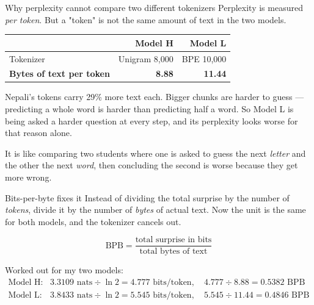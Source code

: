 \documentclass[11pt]{report}
\begin{document}
\begin{concept}{Why perplexity cannot compare two different tokenizers}
Perplexity is measured \emph{per token}. But a "token" is not the same amount of
text in the two models.

\begin{center}
\begin{tabular}{lrr}
\toprule
& Model H & Model L \\
\midrule
Tokenizer & Unigram 8,000 & BPE 10,000 \\
\textbf{Bytes of text per token} & \textbf{8.88} & \textbf{11.44} \\
\bottomrule
\end{tabular}
\end{center}

Nepali's tokens carry 29\% more text each. Bigger chunks are harder to guess ---
predicting a whole word is harder than predicting half a word. So Model L is
being asked a harder question at every step, and its perplexity looks worse for
that reason alone.

It is like comparing two students where one is asked to guess the next
\emph{letter} and the other the next \emph{word}, then concluding the second is
worse because they get more wrong.
\end{concept}

\begin{concept}{Bits-per-byte fixes it}
Instead of dividing the total surprise by the number of \emph{tokens}, divide it
by the number of \emph{bytes} of actual text. Now the unit is the same for both
models, and the tokenizer cancels out.

\[
\text{BPB} = \frac{\text{total surprise in bits}}{\text{total bytes of text}}
\]

Worked out for my two models:
\begin{align*}
\text{Model H:} \quad & 3.3109 \text{ nats} \div \ln 2 = 4.777 \text{ bits/token},
  \quad 4.777 \div 8.88 = \mathbf{0.5382} \text{ BPB} \\
\text{Model L:} \quad & 3.8433 \text{ nats} \div \ln 2 = 5.545 \text{ bits/token},
  \quad 5.545 \div 11.44 = \mathbf{0.4846} \text{ BPB}
\end{align*}
\end{concept}
\end{document}
